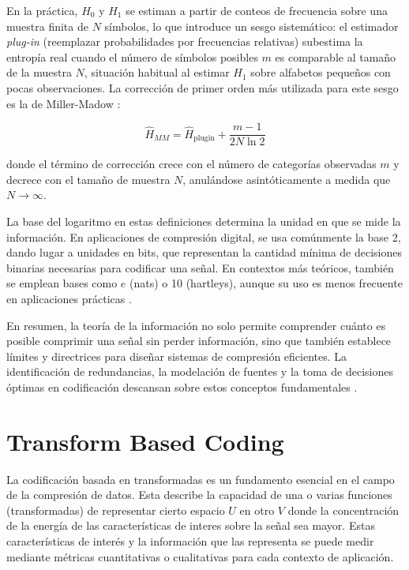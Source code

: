En la práctica, $H_0$ y $H_1$ se estiman a partir de conteos de frecuencia sobre una muestra
finita de $N$ símbolos, lo que introduce un sesgo sistemático: el estimador \textit{plug-in}
(reemplazar probabilidades por frecuencias relativas) subestima la entropía real cuando el
número de símbolos posibles $m$ es comparable al tamaño de la muestra $N$, situación habitual al
estimar $H_1$ sobre alfabetos pequeños con pocas observaciones. La corrección de primer orden más
utilizada para este sesgo es la de Miller-Madow \cite{miller1955note}:

\begin{equation}
    \hat{H}_{MM} = \hat{H}_{\text{plugin}} + \frac{m - 1}{2N\ln 2}
\label{eq: miller_madow}
\end{equation}

donde el término de corrección crece con el número de categorías observadas $m$ y decrece con el
tamaño de muestra $N$, anulándose asintóticamente a medida que $N \to \infty$.

La base del logaritmo en estas definiciones determina la unidad en que se mide la información. En aplicaciones de compresión digital, se usa comúnmente la base 2, dando lugar a unidades en bits, que representan la cantidad mínima de decisiones binarias necesarias para codificar una señal. En contextos más teóricos, también se emplean bases como $e$ (nats) o 10 (hartleys), aunque su uso es menos frecuente en aplicaciones prácticas \cite{sayood2006introduction}.

En resumen, la teoría de la información no solo permite comprender cuánto es posible comprimir una señal sin perder información, sino que también establece límites y directrices para diseñar sistemas de compresión eficientes. La identificación de redundancias, la modelación de fuentes y la toma de decisiones óptimas en codificación descansan sobre estos conceptos fundamentales \cite{sayood2006introduction}.

\section{Transform Based Coding}\label{sec:transform_based_coding}
    La codificación basada en transformadas es un fundamento esencial en el campo de la compresión de datos. Esta describe la capacidad de una o varias funciones (transformadas) de representar cierto espacio $U$ en otro $V$ donde la concentración de la energía de las características de interes sobre la señal sea mayor. Estas características de interés y la información que las representa se puede medir mediante métricas cuantitativas o cualitativas para cada contexto de aplicación.
    \\
    
